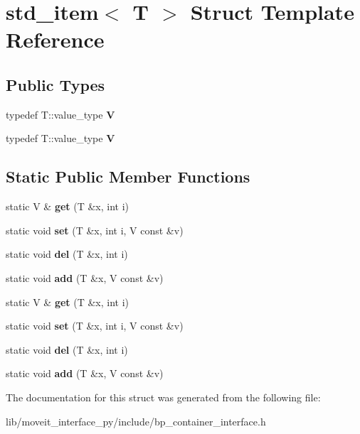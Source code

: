 \hypertarget{structstd__item}{}\section{std\+\_\+item$<$ T $>$ Struct Template Reference}
\label{structstd__item}
\subsection*{Public Types}
\begin{DoxyCompactItemize}
\item 
\mbox{\label{structstd__item_a978c5a033f4aba8658e24665dfe0536b}} 
typedef T\+::value\+\_\+type {\bfseries V}
\item 
\mbox{\label{structstd__item_a978c5a033f4aba8658e24665dfe0536b}} 
typedef T\+::value\+\_\+type {\bfseries V}
\end{DoxyCompactItemize}
\subsection*{Static Public Member Functions}
\begin{DoxyCompactItemize}
\item 
\mbox{\label{structstd__item_a21e077b289a3ff0499cf32752ebdc099}} 
static V \& {\bfseries get} (T \&x, int i)
\item 
\mbox{\label{structstd__item_a29cf4c955bf3361a3464da7d408446b9}} 
static void {\bfseries set} (T \&x, int i, V const \&v)
\item 
\mbox{\label{structstd__item_afffd0335edf3bfa82c47981ba5707a4c}} 
static void {\bfseries del} (T \&x, int i)
\item 
\mbox{\label{structstd__item_a4f8c0188ad4ecf94723d432509dbc334}} 
static void {\bfseries add} (T \&x, V const \&v)
\item 
\mbox{\label{structstd__item_a21e077b289a3ff0499cf32752ebdc099}} 
static V \& {\bfseries get} (T \&x, int i)
\item 
\mbox{\label{structstd__item_a29cf4c955bf3361a3464da7d408446b9}} 
static void {\bfseries set} (T \&x, int i, V const \&v)
\item 
\mbox{\label{structstd__item_afffd0335edf3bfa82c47981ba5707a4c}} 
static void {\bfseries del} (T \&x, int i)
\item 
\mbox{\label{structstd__item_a4f8c0188ad4ecf94723d432509dbc334}} 
static void {\bfseries add} (T \&x, V const \&v)
\end{DoxyCompactItemize}


The documentation for this struct was generated from the following file\+:\begin{DoxyCompactItemize}
\item 
lib/moveit\+\_\+interface\+\_\+py/include/bp\+\_\+container\+\_\+interface.\+h\end{DoxyCompactItemize}
